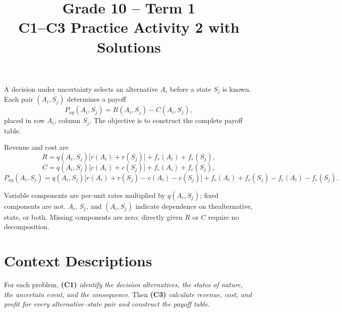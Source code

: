 \makeatletter
{}
\makeatother






\title{Grade 10 -- Term 1 \\ C1--C3 Practice Activity 2 with Solutions}
\author{}
\date{}

\pagestyle{empty}

\geometry{
	margin=0.3in,
	bottom=0.3in
}



	A decision under uncertainty selects an alternative \(A_i\) before a state
	\(S_j\) is known. Each pair \((A_i,S_j)\) determines a payoff
	\[
	P_{ay}(A_i,S_j)=R(A_i,S_j)-C(A_i,S_j),
	\]
	placed in row \(A_i\), column \(S_j\). The objective is to construct the
	complete payoff table.
	
	Revenue and cost are
	\[
	R=q(A_i,S_j)\big[r(A_i)+r(S_j)\big]+f_r(A_i)+f_r(S_j),
	\]
	\[
	C=q(A_i,S_j)\big[c(A_i)+c(S_j)\big]+f_c(A_i)+f_c(S_j),
	\]
	\[
	P_{ay}(A_i,S_j)=q(A_i,S_j)\big[r(A_i)+r(S_j)-c(A_i)-c(S_j) \big]
	+f_r(A_i)+f_r(S_j)-f_c(A_i)-f_c(S_j).
	\]
	
	Variable components are per-unit rates multiplied by \(q(A_i,S_j)\); fixed components are not. \(A_i\), \(S_j\), and \((A_i,S_j)\) indicate dependence on thealternative, state, or both. Missing components are zero; directly given
	\(R\) or \(C\) require no decomposition. \vspace{-13mm}

	\section*{Context Descriptions}
	\vspace{-3mm}

	For each problem, \textbf{(C1)} \textit{identify the decision alternatives, the states of nature, the uncertain event, and the consequence}. Then \textbf{(C3)} \textit{calculate revenue, cost, and profit for every alternative--state pair and construct the payoff table}.
	
